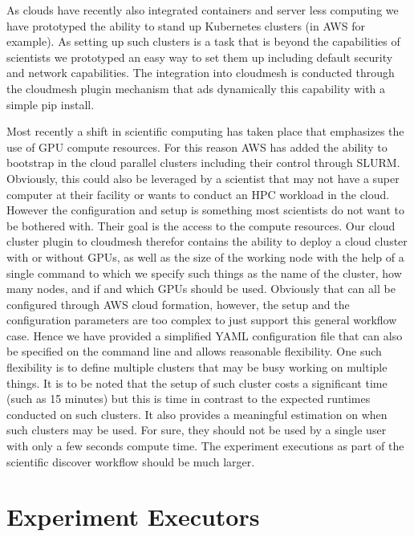 \documentclass[utf8]{FrontiersinVancouver} %
\begin{document}
As clouds have recently also integrated containers and server less computing we have prototyped the ability to stand up Kubernetes clusters (in AWS for example). As setting up such clusters is a task that is beyond the capabilities of scientists we prototyped an easy way to set them up including default security and network capabilities. The integration into cloudmesh is conducted through the cloudmesh plugin mechanism that ads dynamically this capability with a simple pip install.

Most recently a shift in scientific computing has taken place that emphasizes the use of GPU compute resources. For this reason AWS has added the ability to bootstrap in the cloud parallel clusters including their control through SLURM. Obviously, this could also be leveraged by a scientist that may not have a super computer at their facility or wants to conduct an HPC workload in the cloud. However the configuration and setup is something most scientists do not want to be bothered with. Their goal is the access to the compute resources. Our cloud cluster plugin to cloudmesh therefor contains the ability to deploy a cloud cluster with or without GPUs, as well as the size of the working node with the help of a single command to which we specify such things as the name of the cluster, how many nodes, and if and which GPUs should be used. Obviously that can all be configured through AWS cloud formation, however, the setup and the configuration parameters are too complex to just support this general workflow case. Hence we have provided a simplified YAML configuration file that can also be specified on the command line  and allows reasonable flexibility. One such flexibility is to define multiple clusters that may be busy working on multiple things. It is to be noted that the setup of such cluster costs a significant time (such as 15 minutes) but this is time in contrast to the expected runtimes conducted on such clusters. It also provides a meaningful estimation on when such clusters may be used. For sure, they should not be used by a single user with only a few seconds compute time.  The experiment executions as part of the scientific discover workflow should be much larger.





\section{Experiment Executors}
\end{document}
